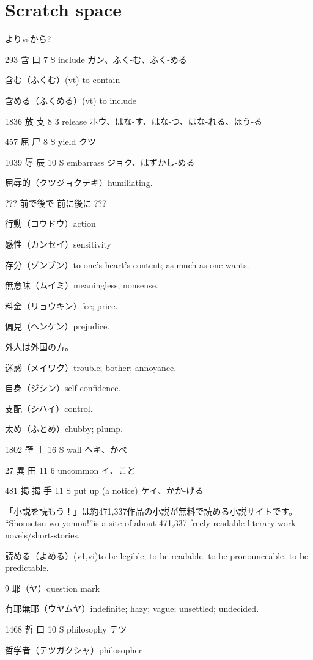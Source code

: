 \chapter{Scratch space}

よりvsから?

293	含		口	7	S		include	ガン、ふく-む、ふく-める

含む（ふくむ）(vt) to contain

含める（ふくめる）(vt) to include

1836	放		攴	8	3		release	ホウ、はな-す、はな-つ、はな-れる、ほう-る

457	屈		尸	8	S		yield	クツ

1039	辱		辰	10	S		embarrass	ジョク、はずかし-める

屈辱的（クツジョクテキ）humiliating.

???
前で後で
前に後に
???

行動（コウドウ）action

感性（カンセイ）sensitivity

存分（ゾンブン）to one's heart's content; as much as one wants.

無意味（ムイミ）meaningless; nonsense.

料金（リョウキン）fee; price.

偏見（ヘンケン）prejudice.

外人は外国の方。

迷惑（メイワク）trouble; bother; annoyance.

自身（ジシン）self-confidence.

支配（シハイ）control.

太め（ふとめ）chubby; plump.

1802	壁		土	16	S		wall	ヘキ、かべ

27	異		田	11	6		uncommon	イ、こと

481	掲	揭	手	11	S		put up (a notice)	ケイ、かか-げる

「小説を読もう！」は約471,337作品の小説が無料で読める小説サイトです。
``Shousetsu-wo yomou!''is a site of about 471,337 freely-readable literary-work novels/short-stories.

読める（よめる）(v1,vi)to be legible; to be readable.
to be pronounceable.
to be predictable.

9 耶（ヤ）question mark

有耶無耶（ウヤムヤ）indefinite; hazy; vague; unsettled; undecided.

1468	哲		口	10	S		philosophy	テツ

哲学者（テツガクシャ）philosopher

